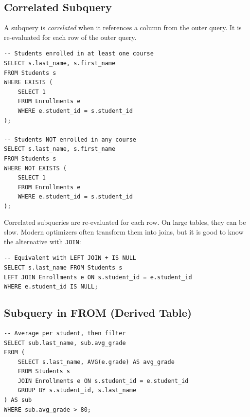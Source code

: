 \subsection{Correlated Subquery}

\begin{definition}
A subquery is \emph{correlated} when it references a column from the outer
query. It is re-evaluated for each row of the outer query.
\end{definition}

\begin{codeblock}[title=\textbf{Correlated Subquery with EXISTS}]
\begin{verbatim}
-- Students enrolled in at least one course
SELECT s.last_name, s.first_name
FROM Students s
WHERE EXISTS (
    SELECT 1
    FROM Enrollments e
    WHERE e.student_id = s.student_id
);

-- Students NOT enrolled in any course
SELECT s.last_name, s.first_name
FROM Students s
WHERE NOT EXISTS (
    SELECT 1
    FROM Enrollments e
    WHERE e.student_id = s.student_id
);
\end{verbatim}
\end{codeblock}

\begin{warning}[title=\textbf{Performance of Correlated Subqueries}]
Correlated subqueries are re-evaluated for each row. On large tables,
they can be slow. Modern optimizers often transform them into joins, but
it is good to know the alternative with \texttt{JOIN}:
\begin{verbatim}
-- Equivalent with LEFT JOIN + IS NULL
SELECT s.last_name FROM Students s
LEFT JOIN Enrollments e ON s.student_id = e.student_id
WHERE e.student_id IS NULL;
\end{verbatim}
\end{warning}

\subsection{Subquery in FROM (Derived Table)}

\begin{codeblock}[title=\textbf{Subquery in FROM}]
\begin{verbatim}
-- Average per student, then filter
SELECT sub.last_name, sub.avg_grade
FROM (
    SELECT s.last_name, AVG(e.grade) AS avg_grade
    FROM Students s
    JOIN Enrollments e ON s.student_id = e.student_id
    GROUP BY s.student_id, s.last_name
) AS sub
WHERE sub.avg_grade > 80;
\end{verbatim}
\end{codeblock}

